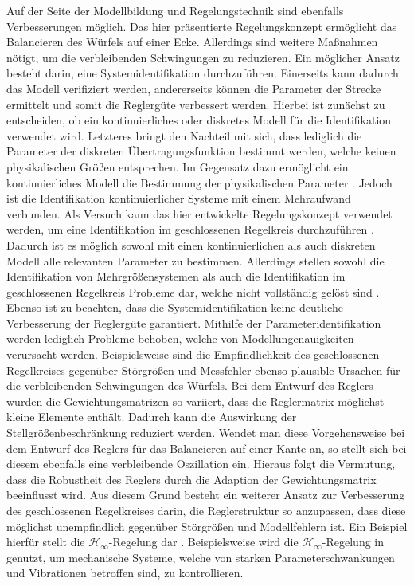 Auf der Seite der Modellbildung und Regelungstechnik sind ebenfalls Verbesserungen möglich. Das hier präsentierte Regelungskonzept ermöglicht das Balancieren des Würfels auf einer Ecke. Allerdings sind weitere Maßnahmen nötigt, um die verbleibenden Schwingungen zu reduzieren. Ein möglicher Ansatz besteht darin, eine Systemidentifikation durchzuführen. Einerseits kann dadurch das Modell verifiziert werden, andererseits können die Parameter der Strecke ermittelt und somit die Reglergüte verbessert werden. Hierbei ist zunächst zu entscheiden, ob ein kontinuierliches oder diskretes Modell für die Identifikation verwendet wird. Letzteres bringt den Nachteil mit sich, dass lediglich die Parameter der diskreten Übertragungsfunktion bestimmt werden, welche keinen physikalischen Größen entsprechen. Im Gegensatz dazu ermöglicht ein kontinuierliches Modell die Bestimmung der physikalischen Parameter \cite[S. 189 ff.]{UnbehauenSysId}. Jedoch ist die Identifikation kontinuierlicher Systeme mit einem Mehraufwand verbunden.
Als Versuch kann das hier entwickelte Regelungskonzept verwendet werden, um eine Identifikation im geschlossenen Regelkreis durchzuführen \cite[S. 126 ff.]{UnbehauenSysId}. Dadurch ist es möglich sowohl mit einen kontinuierlichen als auch diskreten Modell alle relevanten Parameter zu bestimmen. Allerdings stellen sowohl die Identifikation von Mehrgrößensystemen als auch die Identifikation im geschlossenen Regelkreis Probleme dar, welche nicht vollständig gelöst sind \cite[S. 187 f.]{UnbehauenSysId}. Ebenso ist zu beachten, dass die Systemidentifikation keine deutliche Verbesserung der Reglergüte garantiert. Mithilfe der Parameteridentifikation werden lediglich Probleme behoben, welche von Modellungenauigkeiten verursacht werden. Beispielsweise sind die Empfindlichkeit des geschlossenen Regelkreises gegenüber Störgrößen und Messfehler ebenso plausible Ursachen für die verbleibenden Schwingungen des Würfels. 
Bei dem Entwurf des Reglers wurden die Gewichtungsmatrizen so variiert, dass die Reglermatrix möglichst kleine Elemente enthält. Dadurch kann die Auswirkung der Stellgrößenbeschränkung reduziert werden. Wendet man diese Vorgehensweise bei dem Entwurf des Reglers für das Balancieren auf einer Kante an, so stellt sich bei diesem ebenfalls eine verbleibende Oszillation ein. Hieraus folgt die Vermutung, dass die Robustheit des Reglers durch die Adaption der Gewichtungsmatrix beeinflusst wird.
Aus diesem Grund besteht ein weiterer Ansatz zur Verbesserung des geschlossenen Regelkreises darin, die Reglerstruktur so anzupassen, dass diese möglichst unempfindlich gegenüber Störgrößen und Modellfehlern ist. Ein Beispiel hierfür stellt die $\mathcal{H}_\infty$-Regelung dar \cite[S. 224 ff.]{Ludyk}. Beispielsweise wird die $\mathcal{H}_\infty$-Regelung in \cite{Toda} genutzt, um mechanische Systeme, welche von starken Parameterschwankungen und Vibrationen betroffen sind, zu kontrollieren. 

